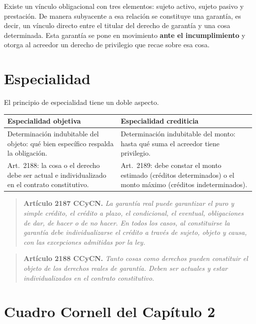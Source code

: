 \documentclass[12pt,oneside]{book}
\begin{document}
Existe un vínculo obligacional con tres elementos: sujeto activo, sujeto pasivo y prestación. De manera subyacente a esa relación se constituye una garantía, es decir, un vínculo directo entre el titular del derecho de garantía y una cosa determinada. Esta garantía se pone en movimiento \textbf{ante el incumplimiento} y otorga al acreedor un derecho de privilegio que recae sobre esa cosa.

\section{Especialidad}

El principio de especialidad tiene un doble aspecto.

\begin{table}[H]
\centering
\begin{tabularx}{\textwidth}{L L}
\toprule
\textbf{Especialidad objetiva} & \textbf{Especialidad crediticia} \\
\midrule
Determinación indubitable del objeto: qué bien específico respalda la obligación. &
Determinación indubitable del monto: hasta qué suma el acreedor tiene privilegio. \\
\addlinespace
Art.~2188: la cosa o el derecho debe ser actual e individualizado en el contrato constitutivo. &
Art.~2189: debe constar el monto estimado (créditos determinados) o el monto máximo (créditos indeterminados). \\
\bottomrule
\end{tabularx}
\end{table}

\begin{quote}
\textbf{Artículo 2187 CCyCN.} \textit{La garantía real puede garantizar el puro y simple crédito, el crédito a plazo, el condicional, el eventual, obligaciones de dar, de hacer o de no hacer. En todos los casos, al constituirse la garantía debe individualizarse el crédito a través de sujeto, objeto y causa, con las excepciones admitidas por la ley.}
\end{quote}

\begin{quote}
\textbf{Artículo 2188 CCyCN.} \textit{Tanto cosas como derechos pueden constituir el objeto de los derechos reales de garantía. Deben ser actuales y estar individualizados en el contrato constitutivo.}
\end{quote}

\section{Cuadro Cornell del Capítulo 2}
\end{document}
